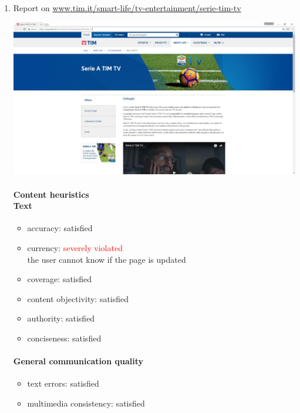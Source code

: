 \begin{enumerate}

\item Report on \url{www.tim.it/smart-life/tv-entertainment/serie-tim-tv}

\begin{center}
	\includegraphics[width=\textwidth]{Screenshot/serieatimtv.jpg}
\end{center}
\vspace{1cm}

	\paragraph*{Content heuristics \\ Text}
	\begin{itemize}
		\item accuracy: satisfied
		\item currency: \textcolor{red}{severely violated}\\
		the user cannot know if the page is updated
		\item coverage: satisfied
		\item content objectivity: satisfied
		\item authority: satisfied
		\item conciseness: satisfied		
	\end{itemize}
	
	\paragraph*{General communication quality}
	\begin{itemize}
		\item text errors: satisfied
		\item multimedia consistency: satisfied
	\end{itemize}
	

\end{enumerate}
